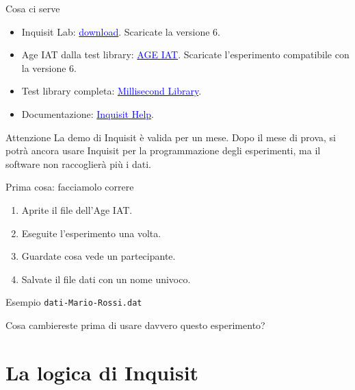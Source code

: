 \documentclass[compress]{beamer}
\begin{document}
\begin{frame}{Cosa ci serve}
\begin{itemize}
  \item Inquisit Lab: \href{https://www.millisecond.com/download/}{\textcolor{blue}{download}}. Scaricate la versione 6.
  \item Age IAT dalla test library: \href{https://www.millisecond.com/download/library/iat/ageiat}{\textcolor{blue}{AGE IAT}}. Scaricate l'esperimento compatibile con la versione 6.
  \item Test library completa: \href{https://www.millisecond.com/download/library}{\textcolor{blue}{Millisecond Library}}.
  \item Documentazione: \href{https://www.millisecond.com/support/docs/current/html/main.htm}{\textcolor{blue}{Inquisit Help}}.
\end{itemize}

\vspace{2mm}
\begin{alertblock}{Attenzione}
La demo di Inquisit è valida per un mese. Dopo il mese di prova, si potrà ancora usare Inquisit per la programmazione degli esperimenti, ma il software non raccoglierà più i dati. 
\end{alertblock}
\end{frame}

\begin{frame}{Prima cosa: facciamolo correre}
\begin{enumerate}
  \item Aprite il file dell'Age IAT.
  \item Eseguite l'esperimento una volta.
  \item Guardate cosa vede un partecipante.
  \item Salvate il file dati con un nome univoco.
\end{enumerate}

\vspace{4mm}
\begin{exampleblock}{Esempio}
\centering
\texttt{dati-Mario-Rossi.dat}
\end{exampleblock}

\vspace{3mm}
Cosa cambiereste prima di usare davvero questo esperimento?
\end{frame}

\section{La logica di Inquisit}
\end{document}
